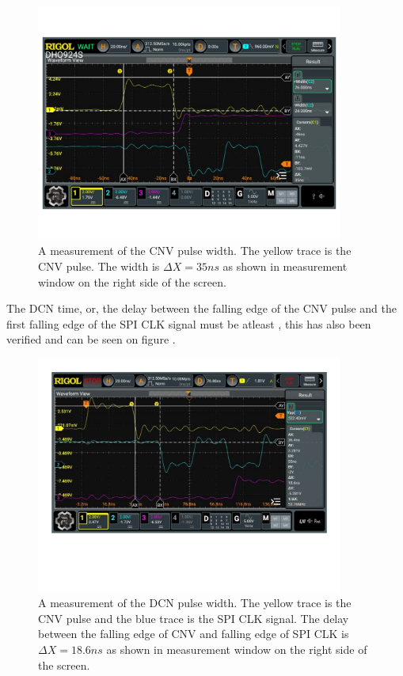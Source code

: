 \begin{figure}[H]
    \centering
    \includegraphics[clip, trim=0 100 0 0, width=0.9\textwidth]{Sections/7_SystemDesign/Figures/7_2_8_ADCControl_CNV_MEASURE.pdf}
    \caption{A measurement of the CNV pulse width. The yellow trace is the CNV pulse. The width is $\Delta X = 35 ns$ as shown in measurement window on the right side of the screen.}
    \label{fig:7_2_8_ADC_CONTROL_CNV_MEAS}
\end{figure}

The DCN time, or, the delay between the falling edge of the CNV pulse and the first falling edge of the SPI CLK signal must be atleast , this has also been verified and can be seen on figure .

\begin{figure}[H]
    \centering
    \includegraphics[clip, trim=0 150 0 0, width=0.9\textwidth]{Sections/7_SystemDesign/Figures/7_2_8_ADC_CONTROL_DCN_MEAS.pdf}
    \caption{A measurement of the DCN pulse width. The yellow trace is the CNV pulse and the blue trace is the SPI CLK signal. The delay between the falling edge of CNV and falling edge of SPI CLK is $\Delta X = 18.6 ns$ as shown in measurement window on the right side of the screen.}
    \label{fig:7_2_8_ADC_CONTROL_DCN_MEAS}
\end{figure}

